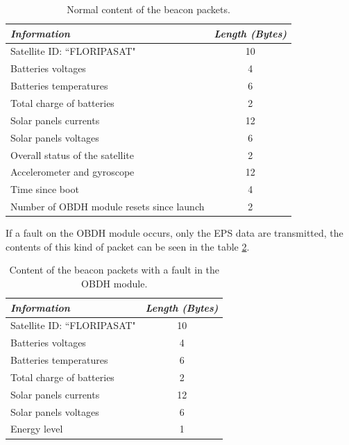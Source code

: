 \documentclass[12pt]{book}
\begin{document}
\begin{table}[!h]
	\begin{center}
		\begin{tabular}{lc}
			\toprule[1.5pt]
			\textit{Information} & \textit{Length (Bytes)} \\
			\midrule
			Satellite ID: ``FLORIPASAT" & 10 \\
			Batteries voltages & 4 \\
			Batteries temperatures & 6 \\
			Total charge of batteries & 2 \\
			Solar panels currents & 12 \\
			Solar panels voltages & 6 \\
			Overall status of the satellite & 2 \\
			Accelerometer and gyroscope & 12 \\
			Time since boot & 4 \\
			Number of OBDH module resets since launch & 2 \\
			\bottomrule[1.5pt]
		\end{tabular}
		\caption{Normal content of the beacon packets.}
		\label{tab:beacon-normal-payload}
	\end{center}
\end{table}

If a fault on the OBDH module occurs, only the EPS data are transmitted, the contents of this kind of packet can be seen in the table \ref{tab:beacon-without-obdh-payload}.

\begin{table}[!h]
	\begin{center}
		\begin{tabular}{lc}
			\toprule[1.5pt]
			\textit{Information} & \textit{Length (Bytes)} \\
			\midrule
			Satellite ID: ``FLORIPASAT" & 10 \\
			Batteries voltages & 4 \\
			Batteries temperatures & 6 \\
			Total charge of batteries & 2 \\
			Solar panels currents & 12 \\
			Solar panels voltages & 6 \\
			Energy level & 1 \\
			\bottomrule[1.5pt]
		\end{tabular}
		\caption{Content of the beacon packets with a fault in the OBDH module.}
		\label{tab:beacon-without-obdh-payload}
	\end{center}
\end{table}
\end{document}

